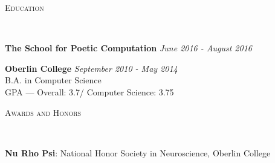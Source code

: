 \documentclass[9pt]{article}
\newenvironment{changemargin}[2]{%
  \begin{list}{}{%
    \setlength{\topsep}{0pt}%
    \setlength{\leftmargin}{#1}%
    \setlength{\rightmargin}{#2}%
    \setlength{\listparindent}{\parindent}%
    \setlength{\itemindent}{\parindent}%
    \setlength{\parsep}{\parskip}%
  }%
  \item[]}{\end{list}
}
\newcommand{\lineover}{
	\begin{changemargin}{-0.05in}{-0.05in}
		\vspace*{-8pt}
		\hrulefill \\
		\vspace*{-2pt}
	\end{changemargin}
}
\newcommand{\header}[1]{
	\begin{changemargin}{-0.5in}{-0.5in}
		\scshape{#1}\\
  	\lineover
	\end{changemargin}
}
\newenvironment{body} {
	\vspace*{-16pt}
	\begin{changemargin}{-0.25in}{-0.5in}
  }	
	{\end{changemargin}
}
\begin{document}
\smallskip

\header{Education}

\begin{body}
	\vspace{14pt}
	\textbf{The School for Poetic Computation}{} \hfill \emph{June 2016 - August 2016}{} \\
	\smallskip

	\textbf{Oberlin College}{} \hfill \emph{September 2010 - May 2014}{} \\
	B.A. in Computer Science \\
	GPA --- Overall: 3.7/ Computer Science: 3.75 \\
\end{body}

\smallskip

\header{Awards and Honors}

\begin{body}
	\vspace{14pt}
	\textbf{Nu Rho Psi}: National Honor Society in Neuroscience, Oberlin College \\
	\smallskip
\end{body}
\end{document}
